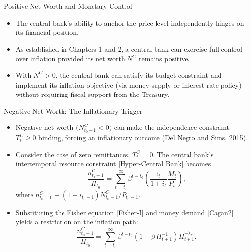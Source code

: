 \documentclass[11pt,aspectratio=169]{beamer}
\begin{document}
\begin{frame}{Positive Net Worth and Monetary Control}
\small
\begin{itemize}
    \item The central bank’s ability to anchor the price level independently hinges on its financial position.
    \item As established in Chapters 1 and 2, a central bank can exercise full control over inflation provided its net worth \(N^{C}\) remains positive.
    \item With \(N^{C}>0\), the central bank can satisfy its budget constraint and implement its inflation objective (via money supply or interest-rate policy) without requiring fiscal support from the Treasury.
\end{itemize}
\end{frame}

\begin{frame}{Negative Net Worth: The Inflationary Trigger}
\small
\begin{itemize}
    \item Negative net worth \(\bigl(N_{t_{0}-1}^{C}<0\bigr)\) can make the independence constraint \(T_{t}^{C}\ge 0\) binding, forcing an inflationary outcome (Del Negro and Sims, 2015).
    
    \item Consider the case of zero remittances, \(T_{t}^{C}=0\). The central bank’s intertemporal resource constraint \eqref{Hyper-Central Bank} becomes
    \begin{equation*}
        -\frac{n_{t_{0}-1}^{C}}{\Pi_{t_{0}}}
        = \sum_{t=t_{0}}^{\infty}\beta^{t-t_{0}}
        \left(\frac{i_{t}}{1+i_{t}}\frac{M_{t}}{P_{t}}\right),
    \end{equation*}
    where \(n_{t_{0}-1}^{C}\equiv (1+i_{t_{0}-1})N_{t_{0}-1}^{C}/P_{t_{0}-1}\).

    \item Substituting the Fisher equation \eqref{Fisher-I} and money demand \eqref{Cagan2} yields a restriction on the inflation path:
    \begin{equation}
        -\frac{n_{t_{0}-1}^{C}}{\Pi_{t_{0}}}
        = \sum_{t=t_{0}}^{\infty}\beta^{t-t_{0}}
        \left(1-\beta\,\Pi_{t+1}^{-1}\right)\Pi_{t+1}^{-\lambda_{\pi}}.
        \label{Inflation-Central Bank}
    \end{equation}
\end{itemize}
\end{frame}
\end{document}
